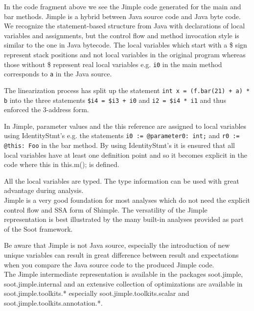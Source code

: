 \documentclass{article}
\newcommand{\code}[1]{\texttt{\small #1}}
\begin{document}
In the code fragment above we see the Jimple code generated for the
\textsf{main} and \textsf{bar} methods. Jimple is a hybrid between
Java source code and Java byte code. We recognize the statement-based
structure from Java with declarations of local variables and
assignments, but the control flow and method invocation style is
similar to the one in Java bytecode. The local variables which start
with a \textsf{\$} sign represent stack positions and not local
variables in the original program whereas those without \textsf{\$}
represent real local variables e.g. \code{i0} in the \textsf{main}
method corresponds to \code{a} in the Java source.

The linearization process has split up the statement \code{int x =
(f.bar(21) + a) * b} into the three statements \code{\$i4 = \$i3 + i0}
and \code{i2 = \$i4 * i1} and thus enforced the 3-address form.

In Jimple, parameter values and the \textsf{this} reference are
assigned to local variables using IdentityStmt's e.g. the statements
\code{i0 := @parameter0: int;} and \code{r0 := @this: Foo} in the
\textsf{bar} method. By using IdentityStmt's it is ensured that all
local variables have at least one definition point and so it becomes
explicit in the code where \textsf{this} in \textsf{this.m();} is 
defined.

All the local variables are typed. The type information can be used
with great advantage during analysis.\\

Jimple is a very good foundation for most analyses which do not need
the explicit control flow and SSA form of Shimple. The versatility of
the Jimple representation is best illustrated by the many built-in
analyses provided as part of the Soot framework.

Be aware that Jimple is not Java source, especially the introduction
of new unique variables can result in great difference between result
and expectations when you compare the Java source code to the produced
Jimple code.\\

The Jimple intermediate representation is available in the packages
soot.jimple, soot.jimple.internal and an extensive collection of
optimizations are available in soot.jimple.toolkits.* especially
soot.jimple.toolkits.scalar and soot.jimple.\-toolkits.\-annotation.*.

\end{document}
